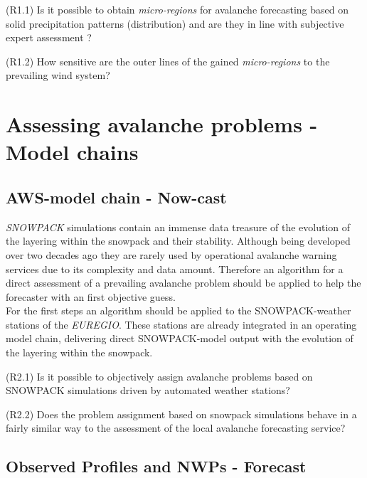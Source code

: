 \begin{tcolorbox}[]
    (R1.1) Is it possible to obtain \textit{micro-regions} for avalanche forecasting based on solid precipitation 
    patterns (distribution) and are they in line with subjective expert assessment ? 
\end{tcolorbox}

\begin{tcolorbox}[]
    (R1.2) How sensitive are the outer lines of the gained \textit{micro-regions} to the prevailing wind system? 
\end{tcolorbox}

%
\section{Assessing avalanche problems - Model chains}

\subsection{AWS-model chain - Now-cast}
\textit{SNOWPACK} simulations contain an immense data treasure of the evolution of the layering within the snowpack 
and their stability. Although being developed over two decades ago they are rarely used by operational avalanche 
warning services due to its complexity and data amount. Therefore an algorithm for a direct assessment of a 
prevailing avalanche problem should be applied to help the forecaster with an first objective guess.\\
For the first steps an algorithm should be applied to the SNOWPACK-weather stations of the \textit{EUREGIO}. 
These stations are already integrated in an operating model chain, delivering direct SNOWPACK-model output 
with the evolution of the layering within the snowpack.

\begin{tcolorbox}[]
    (R2.1) Is it possible to objectively assign avalanche problems based on SNOWPACK simulations driven by 
    automated weather stations?
\end{tcolorbox}

\begin{tcolorbox}[]
    (R2.2) Does the problem assignment based on snowpack simulations behave in a fairly similar way to the
     assessment of the local avalanche forecasting service?
\end{tcolorbox}

\subsection{Observed Profiles and NWPs - Forecast } 


